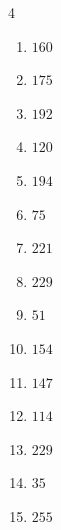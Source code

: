 \begin{multicols}{4}
\begin{enumerate}
\columnbreak %

  \item $160$


  \item $175$


  \item $192$


  \item $120$


  \item $194$


  \item $75$


  \item $221$


  \item $229$


  \item $51$


  \item $154$


  \item $147$


  \item $114$


  \item $229$


  \item $35$


  \item $255$


\columnbreak %


\end{enumerate}
\end{multicols}
